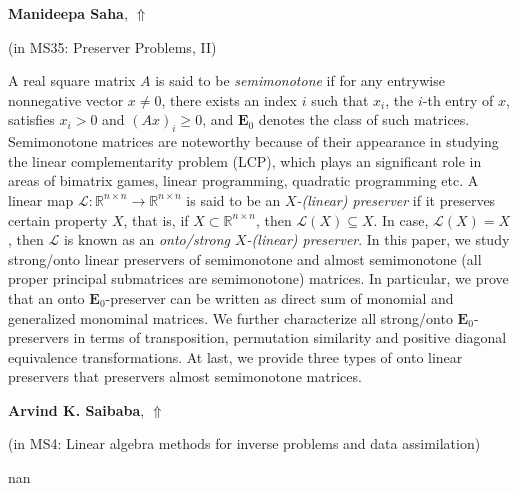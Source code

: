 \documentclass[ILAS2025-program.tex]{subfiles}
\begin{document}
     \hypertarget{down0318}{}\begin{ilasabstract}
    
    \textbf{Manideepa Saha},  \hfill \hyperlink{up0318}{$\Uparrow$}
    
    (in {\color{mstitle}MS35: Preserver Problems, II})
        
        \mtskip
    A real square matrix $A$ is said to be {\it semimonotone} if for any entrywise nonnegative vector $x\neq 0$, there exists an index $i$ such that  $x_i$, the $i$-th entry of $x$, satisfies $x_i>0$ and $(Ax)_i\ge 0$, and $\mathbf{E}_{0}$ denotes the class of such matrices.  Semimonotone matrices are noteworthy because of their appearance in studying the linear complementarity problem (LCP), which plays an significant role in areas of  bimatrix games, linear programming, quadratic programming etc.   A linear  map $\mathcal{L}:\mathbb{R}^{n\times n}\to\mathbb{R}^{n\times n}$ is said to be an {\it$X$-(linear) preserver} if it preserves certain property $X$, that is, if $X\subset\mathbb{R}^{n\times n}$, then $\mathcal{L}(X)\subseteq X$. In case, $\mathcal{L}(X)= X$, then $\mathcal{L}$ is known as an {\it onto/strong $X$-(linear) preserver}. In this paper, we study strong/onto linear preservers of semimonotone  and almost semimonotone (all proper principal submatrices are semimonotone) matrices. In particular, we prove that an onto $\mathbf{E}_0$-preserver can be written as direct sum of monomial and generalized monominal matrices. We further characterize all strong/onto $\mathbf{E}_0$-preservers in terms of transposition, permutation similarity and positive diagonal equivalence transformations. At last, we provide three types of onto linear preservers that preservers almost semimonotone matrices.
\end{ilasabstract}
     \hypertarget{down0358}{}\begin{ilasabstract}
    
    \textbf{Arvind K. Saibaba},  \hfill \hyperlink{up0358}{$\Uparrow$}
    
    (in {\color{mstitle}MS4: Linear algebra methods for inverse problems and data assimilation})
        
        \mtskip
    nan\end{ilasabstract}
\end{document}
